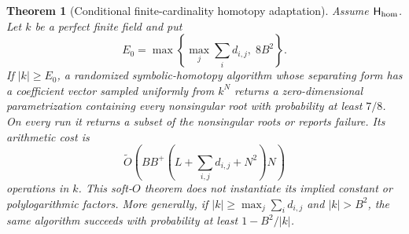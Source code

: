 \documentclass[11pt]{article}
\newtheorem{theorem}{Theorem}[section]
\begin{document}
\begin{theorem}[Conditional finite-cardinality homotopy adaptation]
\label{thm:finite-cardinality-homotopy}
Assume $\mathsf H_{\rm hom}$.  Let $k$ be a perfect finite field and put
\[
 E_0=\max\left\{
      \max_j\sum_i d_{i,j},\;8B^2
      \right\}.
\]
If $|k|\ge E_0$, a randomized symbolic-homotopy algorithm whose separating
form has a coefficient vector sampled uniformly from $k^N$ returns a
zero-dimensional parametrization containing every nonsingular root with
probability at least $7/8$.  On every run it returns a subset of the
nonsingular roots or reports failure.  Its arithmetic cost is
\[
 \widetilde O\!\left(
 B B^+
 \left(L+\sum_{i,j}d_{i,j}+N^2\right)N
 \right)
\]
operations in $k$.  This soft-$O$ theorem does not instantiate its implied
constant or polylogarithmic factors.
More generally, if $|k|\ge\max_j\sum_i d_{i,j}$ and $|k|>B^2$, the same
algorithm succeeds with probability at least $1-B^2/|k|$.
\end{theorem}
\end{document}
